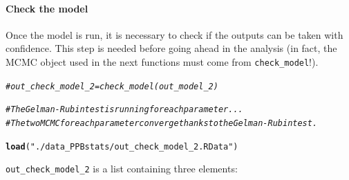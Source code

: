 \documentclass{article}\usepackage[]{graphicx}\usepackage[]{color}
\makeatletter
\newcommand{\hlstr}[1]{\textcolor[rgb]{0.192,0.494,0.8}{#1}}%
\newcommand{\hlcom}[1]{\textcolor[rgb]{0.678,0.584,0.686}{\textit{#1}}}%
\newcommand{\hlstd}[1]{\textcolor[rgb]{0.345,0.345,0.345}{#1}}%
\newcommand{\hlkwd}[1]{\textcolor[rgb]{0.737,0.353,0.396}{\textbf{#1}}}%
\newenvironment{kframe}{%
 \def\at@end@of@kframe{}%
 \ifinner\ifhmode%
  \def\at@end@of@kframe{\end{minipage}}%
  \begin{minipage}{\columnwidth}%
 \fi\fi%
 \def\FrameCommand##1{\hskip\@totalleftmargin \hskip-\fboxsep
 \colorbox{shadecolor}{##1}\hskip-\fboxsep
     \hskip-\linewidth \hskip-\@totalleftmargin \hskip\columnwidth}%
 \MakeFramed {\advance\hsize-\width
   \@totalleftmargin\z@ \linewidth\hsize
   \@setminipage}}%
 {\par\unskip\endMakeFramed%
 \at@end@of@kframe}
\newenvironment{knitrout}{}{} %
\makeatother
\begin{document}
\paragraph{Check the model}

Once the model is run, it is necessary to check if the outputs can be taken with confidence. 
This step is needed before going ahead in the analysis (in fact, the MCMC object used in the next functions must come from \texttt{check\_model}!).


\begin{knitrout}
\color{fgcolor}\begin{kframe}
\begin{alltt}
\hlcom{# out_check_model_2 = check_model(out_model_2)}

\hlcom{# The Gelman-Rubin test is running for each parameter ...}
\hlcom{# The two MCMC for each parameter converge thanks to the Gelman-Rubin test.}

\hlkwd{load}\hlstd{(}\hlstr{"./data_PPBstats/out_check_model_2.RData"}\hlstd{)}
\end{alltt}
\end{kframe}
\end{knitrout}

\texttt{out\_check\_model\_2} is a list containing three elements:
\end{document}
